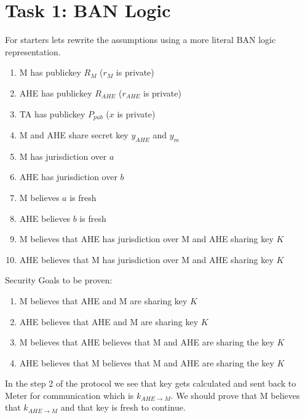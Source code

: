 \documentclass[a4paper, 11pt]{article}
\begin{document}
\section{Task 1: BAN Logic}
For starters lets rewrite the assumptions using a more literal BAN logic
representation.
\begin{enumerate}
    \item M has publickey $R_M$ ($r_M$ is private)
    \item AHE has publickey $R_{AHE}$ ($r_{AHE}$ is private)
    \item TA has publickey $P_{pub}$ ($x$ is private)
    \item M and AHE share secret key $y_{AHE}$ and $y_m$
    \item M has jurisdiction over $a$
    \item AHE has jurisdiction over $b$
    \item M believes $a$ is fresh
    \item AHE believes $b$ is fresh
    \item M believes that AHE has jurisdiction over M and AHE sharing key $K$
    \item AHE believes that M has jurisdiction over M and AHE sharing key $K$
\end{enumerate}
Security Goals to be proven:
\begin{enumerate}
    \item M believes that AHE and M are sharing key $K$
    \item AHE believes that AHE and M are sharing key $K$
    \item M believes that AHE believes that M and AHE are sharing the key $K$
    \item AHE believes that M believes that M and AHE are sharing the key $K$
\end{enumerate}
In the step 2 of the protocol we see that key gets calculated and
sent back to Meter for communication which is $k_{AHE \rightarrow M}$.
We should prove that M believes that $k_{AHE \rightarrow M}$ and that key is
fresh to continue.
\end{document}
